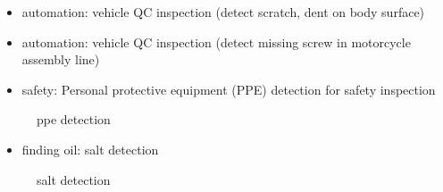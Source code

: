 \documentclass[
  paper=6in:9in,
  pagesize=pdftex,
  headinclude=on,
  footinclude=on,
  12pt]{scrbook}
\providecommand{\tightlist}{%
  \setlength{\itemsep}{0pt}\setlength{\parskip}{0pt}}\usepackage{longtable,booktabs,array}
\begin{document}
\begin{itemize}
\item
  automation: vehicle QC inspection (detect scratch, dent on body
  surface)
\item
  automation: vehicle QC inspection (detect missing screw in motorcycle
  assembly line)
\item
  safety: Personal protective equipment (PPE) detection for safety
  inspection
\end{itemize}

\begin{figure}[H]


\caption{\label{fig-karat}ppe detection}

\end{figure}%

\begin{itemize}
\tightlist
\item
  finding oil: salt detection
\end{itemize}

\begin{figure}[H]


\caption{\label{fig-salt}salt detection}

\end{figure}%
\end{document}
